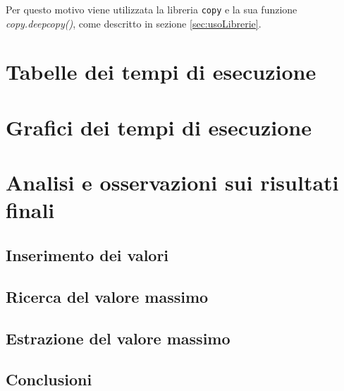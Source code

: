 \documentclass{article}
\begin{document}
Per questo motivo viene utilizzata la libreria \verb|copy| e la sua funzione \textit{copy.deepcopy()}, come descritto in sezione \ref{sec:usoLibrerie}.


\clearpage

\section{Tabelle dei tempi di esecuzione}

\label{sec:tabelleTempi}

\clearpage

\section{Grafici dei tempi di esecuzione}

\clearpage

\section{Analisi e osservazioni sui risultati finali}

\subsection{Inserimento dei valori}

\subsection{Ricerca del valore massimo}

\subsection{Estrazione del valore massimo}

\subsection{Conclusioni}
\end{document}
